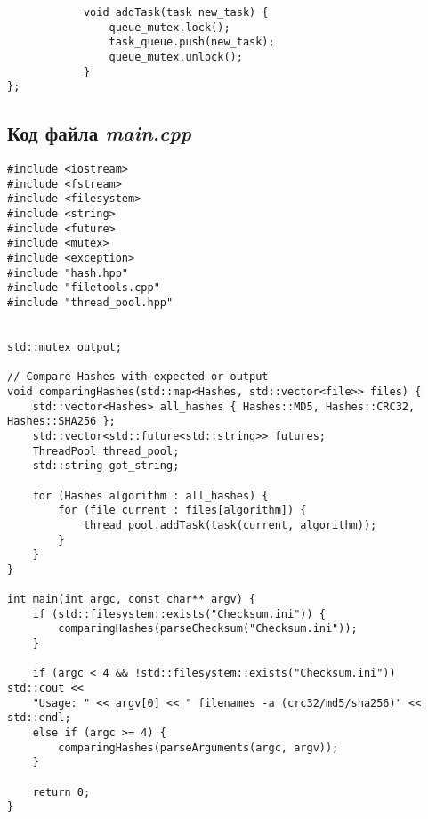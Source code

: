 \documentclass[a4paper, 12pt]{article}
\begin{document}
\begin{verbatim}
            void addTask(task new_task) {
                queue_mutex.lock();
                task_queue.push(new_task);
                queue_mutex.unlock();
            }
};
\end{verbatim}

\subsection{Код файла \textit{main.cpp}}

\fontsize{9}{9}\selectfont
\begin{verbatim}
#include <iostream>
#include <fstream>
#include <filesystem>
#include <string>
#include <future>
#include <mutex>
#include <exception>
#include "hash.hpp"
#include "filetools.cpp"
#include "thread_pool.hpp"


std::mutex output;

// Compare Hashes with expected or output
void comparingHashes(std::map<Hashes, std::vector<file>> files) {
    std::vector<Hashes> all_hashes { Hashes::MD5, Hashes::CRC32, Hashes::SHA256 };
    std::vector<std::future<std::string>> futures;
    ThreadPool thread_pool;
    std::string got_string;
    
    for (Hashes algorithm : all_hashes) {
        for (file current : files[algorithm]) {
            thread_pool.addTask(task(current, algorithm));
        }
    }
}

int main(int argc, const char** argv) {
    if (std::filesystem::exists("Checksum.ini")) {
        comparingHashes(parseChecksum("Checksum.ini"));
    }

    if (argc < 4 && !std::filesystem::exists("Checksum.ini")) std::cout << 
    "Usage: " << argv[0] << " filenames -a (crc32/md5/sha256)" << std::endl;
    else if (argc >= 4) {
        comparingHashes(parseArguments(argc, argv));
    }

    return 0;
}
\end{verbatim}
\end{document}
